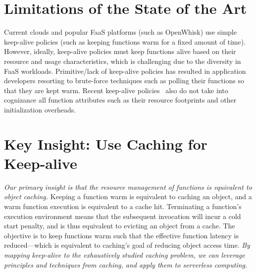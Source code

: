\documentclass[pageno]{jpaper}
\begin{document}
\section{Limitations of the State of the Art}
\vspace*{\subsecspace}


Current clouds and popular FaaS platforms (such as OpenWhisk) use simple keep-alive policies (such as keeping functions warm for a fixed amount of time).
%
However, ideally, keep-alive policies must keep functions alive based on their resource and usage characteristics, which is challenging due to the diversity in FaaS workloads. 
%
Primitive/lack of keep-alive policies has resulted in application developers resorting to brute-force techniques such as polling their functions so that they are kept warm. 
%
Recent keep-alive policies~\cite{shahrad_serverless_2020} also do not take into cognizance all function attributes such as their resource footprints and other initialization overheads. 




\section{Key Insight: Use Caching for Keep-alive}
\vspace*{\subsecspace}

\emph{Our primary insight is that the resource management of functions is equivalent to object caching.}
Keeping a function warm is equivalent to caching an object, and a warm function execution is equivalent to a cache hit. 
Terminating a function's execution environment means that the subsequent invocation will incur a cold start penalty, and is thus equivalent to evicting an object from a cache. 
The objective is to keep functions warm such that the effective function latency is reduced---which is equivalent to caching's goal of reducing object access time. 
\emph{By mapping keep-alive to the exhaustively studied caching problem, we can leverage principles and techniques from caching, and apply them to serverless computing.} 
\end{document}
